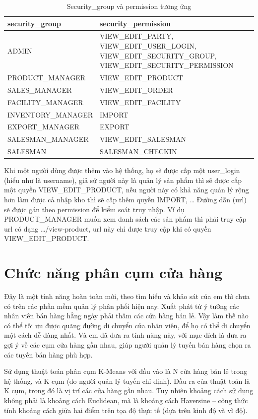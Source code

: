 \begin{table}[H]
\centering
\begin{tabular}{| m{5cm} | m{11cm} |}
\hline
\textbf{security\_group} & \textbf{security\_permission} \\
\hline
ADMIN &
VIEW\_EDIT\_PARTY, VIEW\_EDIT\_USER\_LOGIN,
VIEW\_EDIT\_SECURITY\_GROUP,
VIEW\_EDIT\_SECURITY\_PERMISSION \\
\hline
PRODUCT\_MANAGER &
VIEW\_EDIT\_PRODUCT \\
\hline
SALES\_MANAGER & 
VIEW\_EDIT\_ORDER \\
\hline
FACILITY\_MANAGER & 
VIEW\_EDIT\_FACILITY \\
\hline
INVENTORY\_MANAGER & 
IMPORT \\
\hline
EXPORT\_MANAGER &
EXPORT \\
\hline
SALESMAN\_MANAGER &
VIEW\_EDIT\_SALESMAN \\
\hline
SALESMAN &
SALESMAN\_CHECKIN \\
\hline
\end{tabular}
\caption{Security\_group và permission tương ứng}
\end{table}

Khi một người dùng được thêm vào hệ thống, họ sẽ được cấp một
user\_login (hiểu như là username), giả sử người này là quản lý
sản phẩm thì sẽ được cấp một quyền VIEW\_EDIT\_PRODUCT, nếu người này
có khả năng quản lý rộng hơn làm được cả nhập kho thì sẽ cấp thêm
quyền IMPORT, … Đường dẫn (url) sẽ được gán theo permission để
kiểm soát truy nhập. Ví dụ PRODUCT\_MANAGER muốn xem danh sách các
sản phẩm thì phải truy cập url có dạng …/view-product,
url này chỉ được truy cập khi có quyền VIEW\_EDIT\_PRODUCT.

\section{Chức năng phân cụm cửa hàng}
Đây là một tính năng hoàn toàn mới, theo tìm hiểu và khảo sát của em
thì chưa có trên các phần mềm quản lý phân phối hiện nay. Xuất phát
từ ý tưởng các nhân viên bán hàng hằng ngày phải thăm các cửa hàng bán
lẻ. Vậy làm thế nào có thể tối ưu được quãng đường di chuyển của nhân
viên, để họ có thể di chuyển một cách dễ dàng nhất. Và em đã đưa
ra tính năng này, với mục đích là đưa ra gợi ý về các cụm
cửa hàng gần nhau, giúp người quản lý tuyến bán hàng chọn ra các
tuyến bán hàng phù hợp.

Sử dụng thuật toán phân cụm K-Means với đầu vào là N cửa
hàng bán lẻ trong hệ thống, và K cụm (do người quản lý tuyến
chỉ định). Đầu ra của thuật toán là K cụm, trong đó là vị trí
các cửa hàng gần nhau. Tuy nhiên khoảng cách sử dụng không phải là
khoảng cách Euclidean, mà là khoảng cách Haversine – công thức
tính khoảng cách giữa hai điểm trên tọa độ thực tế
(dựa trên kinh độ và vĩ độ).

